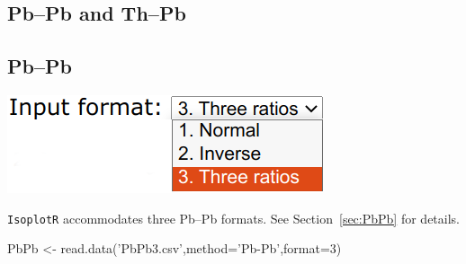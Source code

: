 \begin{refsection}

\chapter{Pb--Pb and Th--Pb}
\label{ch:ThPbPb-R}

\section{Pb--Pb}\label{sec:PbPb-R}

\noindent\begin{minipage}[t]{.3\linewidth}
\strut\vspace*{-\baselineskip}\newline
\includegraphics[width=\linewidth]{../figures/PbPbFormats.png}
\end{minipage}
\begin{minipage}[t]{.7\textwidth}
  \texttt{IsoplotR} accommodates three Pb--Pb formats. See
  Section~\ref{sec:PbPb} for details.
\end{minipage}

\begin{console}
PbPb <- read.data('PbPb3.csv',method='Pb-Pb',format=3)
\end{console}


\end{refsection}
